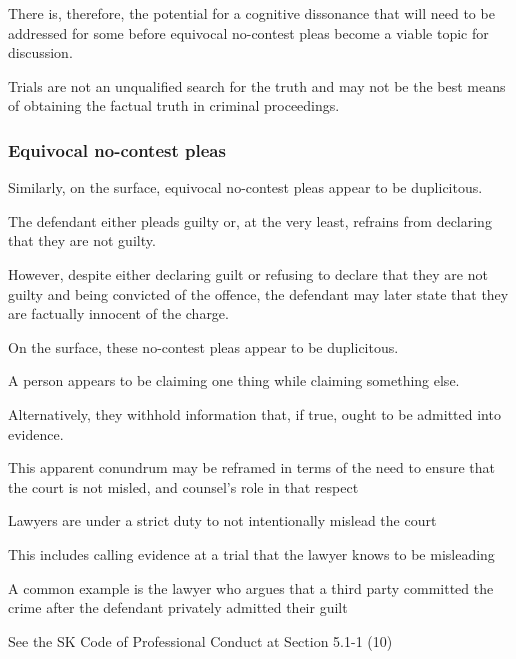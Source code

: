 There is, therefore, the potential for a cognitive dissonance that will need to be addressed for some before equivocal no-contest pleas become a viable topic for discussion.

Trials are not an unqualified search for the truth and may not be the best means of obtaining the factual truth in criminal proceedings.

\subsubsection{Equivocal no-contest pleas}

Similarly, on the surface, equivocal no-contest pleas appear to be duplicitous.

The defendant either pleads guilty or, at the very least, refrains from declaring that they are not guilty.

However, despite either declaring guilt or refusing to declare that they are not guilty and being convicted of the offence, the defendant may later state that they are factually innocent of the charge.

On the surface, these no-contest pleas appear to be duplicitous.

A person appears to be claiming one thing while claiming something else.

Alternatively, they withhold information that, if true, ought to be admitted into evidence.

This apparent conundrum may be reframed in terms of the need to ensure that the court is not misled, and counsel's role in that respect

Lawyers are under a strict duty to not intentionally mislead the court

This includes calling evidence at a trial that the lawyer knows to be misleading

A common example is the lawyer who argues that a third party committed the crime after the defendant privately admitted their guilt

See the SK Code of Professional Conduct at Section 5.1-1 (10)

